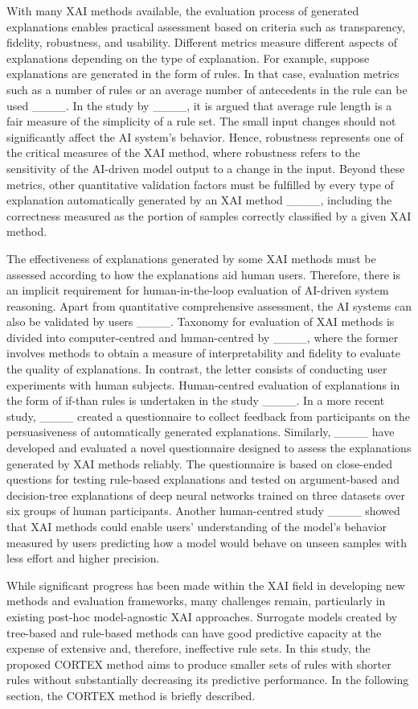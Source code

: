 With many XAI methods available, the evaluation process of generated explanations enables practical assessment based on criteria such as transparency, fidelity, robustness, and usability. Different metrics measure different aspects of explanations depending on the type of explanation. For example, suppose explanations are generated in the form of rules. In that case, evaluation metrics such as a number of rules or an average number of antecedents in the rule can be used ____. In the study by ____, it is argued that average rule length is a fair measure of the simplicity of a rule set. The small input changes should not significantly affect the AI system's behavior. Hence, robustness represents one of the critical measures of the XAI method, where robustness refers to the sensitivity of the AI-driven model output to a change in the input. Beyond these metrics, other quantitative validation factors must be fulfilled by every type of explanation automatically generated by an XAI method ____, including the correctness measured as the portion of samples correctly classified by a given XAI method. 

The effectiveness of explanations generated by some XAI methods must be assessed according to how the explanations aid human users. Therefore, there is an implicit requirement for human-in-the-loop evaluation of AI-driven system reasoning.
Apart from quantitative comprehensive assessment, the AI systems can also be validated by users ____. Taxonomy for evaluation of XAI methods is divided into computer-centred and human-centred by ____, where the former involves methods to obtain a measure of interpretability and fidelity to evaluate the quality of explanations. In contrast, the letter consists of conducting user experiments with human subjects. Human-centred evaluation of explanations in the form of if-than rules is undertaken in the study ____. In a more recent study, ____ created a questionnaire to collect feedback from participants on the persuasiveness of automatically generated explanations. Similarly, ____ have developed and evaluated a novel questionnaire designed to assess the explanations generated by XAI methods reliably. The questionnaire is based on close-ended questions for testing rule-based explanations and tested on argument-based and decision-tree explanations of deep neural networks trained on three datasets over six groups of human participants. Another human-centred study ____ showed that XAI methods could enable users' understanding of the model’s behavior measured by users predicting how a model would behave on unseen samples with less effort and higher precision.

While significant progress has been made within the XAI field in developing new methods and evaluation frameworks, many challenges remain, particularly in existing post-hoc model-agnostic XAI approaches. Surrogate models created by tree-based and rule-based methods can have good predictive capacity at the expense of extensive and, therefore, ineffective rule sets. In this study, the proposed CORTEX method aims to produce smaller sets of rules with shorter rules without substantially decreasing its predictive performance. In the following section, the CORTEX method is briefly described.